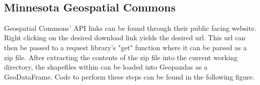 \documentclass[article,12pt]{article}
\numberwithin{equation}{section}
\begin{document}
\\

\subsection*{Minnesota Geospatial Commons}

Geospatial Commons' API links can be found through their public facing website. Right clicking on the desired download link yields the desired url. This url can then be passed to a request library's "get" function where it can be parsed as a zip file. After extracting the contents of the zip file into the current working directory, the shapefiles within can be loaded into Geopandas as a GeoDataFrame. Code to perform these steps can be found in the following figure.
\\
\end{document}
